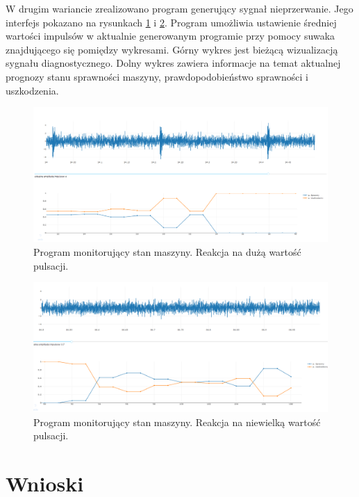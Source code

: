 \documentclass[inzynierska]{pwr_wmat_praca_dyplomowa}
\theoremstyle{plain}
\numberwithin{theorem}{chapter}
\theoremstyle{definition}
\numberwithin{theorem}{chapter}
\begin{document}
W drugim wariancie zrealizowano program generujący sygnał nieprzerwanie. Jego interfejs pokazano na rysunkach \ref{monitor_live_1} i \ref{monitor_live_2}. Program umożliwia ustawienie średniej wartości impulsów w aktualnie generowanym programie przy pomocy suwaka znajdującego się pomiędzy wykresami. Górny wykres jest bieżącą wizualizacją sygnału diagnostycznego. Dolny wykres zawiera informacje na temat aktualnej prognozy stanu sprawności maszyny, prawdopodobieństwo sprawności i uszkodzenia.
\begin{figure}[ht]
	\centering
	\includegraphics[scale=0.4]{images/monitor_live_1.png}
	\caption{Program monitorujący stan maszyny. Reakcja na dużą wartość pulsacji.}
	\label{monitor_live_1}
\end{figure}

\begin{figure}[ht]
	\centering
	\includegraphics[scale=0.4]{images/monitor_live_2.png}
	\caption{Program monitorujący stan maszyny. Reakcja na niewielką wartość pulsacji.}
	\label{monitor_live_2}
\end{figure}

{\backmatter \chapter{Wnioski}}
\newpage
\end{document}
